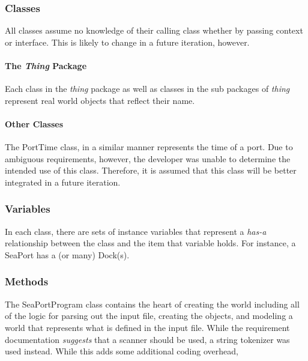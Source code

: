 \documentclass[english,man]{apa6}
\begin{document}
\subsubsection{Classes}\label{classes}

All classes assume no knowledge of their calling class whether by
passing context or interface. This is likely to change in a future
iteration, however.

\paragraph{\texorpdfstring{The \emph{Thing}
Package}{The Thing Package}}\label{the-thing-package}

Each class in the \emph{thing} package as well as classes in the sub
packages of \emph{thing} represent real world objects that reflect their
name.

\paragraph{Other Classes}\label{other-classes}

The PortTime class, in a similar manner represents the time of a port.
Due to ambiguous requirements, however, the developer was unable to
determine the intended use of this class. Therefore, it is assumed that
this class will be better integrated in a future iteration.

\subsubsection{Variables}\label{variables}

In each class, there are sets of instance variables that represent a
\emph{has-a} relationship between the class and the item that variable
holds. For instance, a SeaPort has a (or many) Dock(s).

\subsubsection{Methods}\label{methods}

The SeaPortProgram class contains the heart of creating the world
including all of the logic for parsing out the input file, creating the
objects, and modeling a world that represents what is defined in the
input file. While the requirement documentation \emph{suggests} that a
scanner should be used, a string tokenizer was used instead. While this
adds some additional coding overhead,
\end{document}
